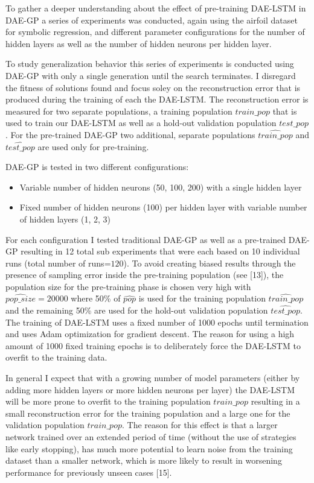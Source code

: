 \documentclass[
  11pt,
]{article}
\providecommand{\tightlist}{%
  \setlength{\itemsep}{0pt}\setlength{\parskip}{0pt}}
\begin{document}
To gather a deeper understanding about the effect of pre-training
DAE-LSTM in DAE-GP a series of experiments was conducted, again using
the airfoil dataset for symbolic regression, and different parameter
configurations for the number of hidden layers as well as the number of
hidden neurons per hidden layer.

To study generalization behavior this series of experiments is conducted
using DAE-GP with only a single generation until the search terminates.
I disregard the fitness of solutions found and focus soley on the
reconstruction error that is produced during the training of each the
DAE-LSTM. The reconstruction error is measured for two separate
populations, a training population \(train\_pop\) that is used to train
our DAE-LSTM as well as a hold-out validation population \(test\_pop\).
For the pre-trained DAE-GP two additional, separate populations
\(\hat{train\_pop}\) and \(\hat{test\_pop}\) are used only for
pre-training.

DAE-GP is tested in two different configurations:

\begin{itemize}
\tightlist
\item
  Variable number of hidden neurons (50, 100, 200) with a single hidden
  layer
\item
  Fixed number of hidden neurons (100) per hidden layer with variable
  number of hidden layers (1, 2, 3)
\end{itemize}

For each configuration I tested traditional DAE-GP as well as a
pre-trained DAE-GP resulting in 12 total sub experiments that were each
based on 10 individual runs (total number of runs=\(120\)). To avoid
creating biased results through the presence of sampling error inside
the pre-training population (see {[}13{]}), the population size for the
pre-training phase is chosen very high with \(\hat{pop\_size}=20000\)
where 50\% of \(\hat{pop}\) is used for the training population
\(\hat{train\_pop}\) and the remaining 50\% are used for the hold-out
validation population \(\hat{test\_pop}\). The training of DAE-LSTM uses
a fixed number of 1000 epochs until termination and uses Adam
optimization for gradient descent. The reason for using a high amount of
1000 fixed training epochs is to deliberately force the DAE-LSTM to
overfit to the training data.

In general I expect that with a growing number of model parameters
(either by adding more hidden layers or more hidden neurons per layer)
the DAE-LSTM will be more prone to overfit to the training population
\(train\_pop\) resulting in a small reconstruction error for the
training population and a large one for the validation population
\(train\_pop\). The reason for this effect is that a larger network
trained over an extended period of time (without the use of strategies
like early stopping), has much more potential to learn noise from the
training dataset than a smaller network, which is more likely to result
in worsening performance for previously unseen cases {[}15{]}.
\end{document}
